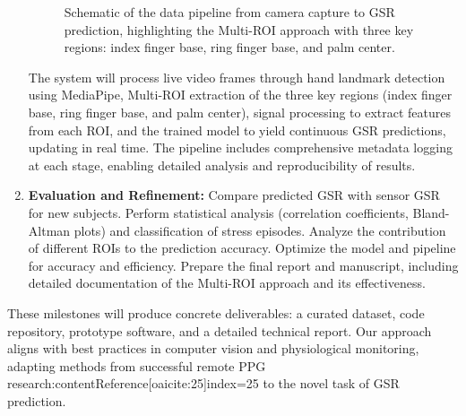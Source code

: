 \documentclass[12pt]{article}
\begin{document}
\begin{enumerate}
        \begin{figure}[ht]
            \centering
            \caption{Schematic of the data pipeline from camera capture to GSR prediction, highlighting the Multi-ROI approach with three key regions: index finger base, ring finger base, and palm center.}
            \label{fig:pipeline}
        \end{figure}
        The system will process live video frames through hand landmark detection using MediaPipe, Multi-ROI extraction of the three key regions (index finger base, ring finger base, and palm center), signal processing to extract features from each ROI, and the trained model to yield continuous GSR predictions, updating in real time. The pipeline includes comprehensive metadata logging at each stage, enabling detailed analysis and reproducibility of results.
        \item \textbf{Evaluation and Refinement:} Compare predicted GSR with sensor GSR for new subjects. Perform statistical analysis (correlation coefficients, Bland-Altman plots) and classification of stress episodes. Analyze the contribution of different ROIs to the prediction accuracy. Optimize the model and pipeline for accuracy and efficiency. Prepare the final report and manuscript, including detailed documentation of the Multi-ROI approach and its effectiveness.
    \end{enumerate}

    These milestones will produce concrete deliverables: a curated dataset, code repository, prototype software, and a detailed technical report. Our approach aligns with best practices in computer vision and physiological monitoring, adapting methods from successful remote PPG research:contentReference[oaicite:25]{index=25} to the novel task of GSR prediction.
\end{document}
